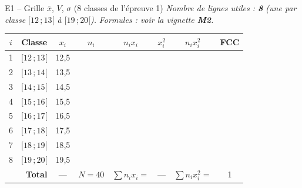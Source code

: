 \documentclass[11pt,a4paper]{article}
\begin{document}
\begin{vignetteMethode}{E1 -- Grille $\bar{x}$, $V$, $\sigma$ (8 classes de l'épreuve 1)}
\emph{Nombre de lignes utiles : \textbf{8} (une par classe $[12\,;13[$ à $[19\,;20[$).}
\emph{Formules : voir la vignette \textbf{M2}.}

\vspace{0.2cm}
\renewcommand{\arraystretch}{1.5}
\begin{center}
\small
\begin{tabular}{|c|c|c|c|c|c|c|c|}
\hline
$i$ & Classe & $x_i$ & $n_i$ & $n_i x_i$ & $x_i^2$ & $n_i x_i^2$ & FCC \\
\hline
1 & $[12\,;13[$ & 12{,}5 & & & & & \\ \hline
2 & $[13\,;14[$ & 13{,}5 & & & & & \\ \hline
3 & $[14\,;15[$ & 14{,}5 & & & & & \\ \hline
4 & $[15\,;16[$ & 15{,}5 & & & & & \\ \hline
5 & $[16\,;17[$ & 16{,}5 & & & & & \\ \hline
6 & $[17\,;18[$ & 17{,}5 & & & & & \\ \hline
7 & $[18\,;19[$ & 18{,}5 & & & & & \\ \hline
8 & $[19\,;20[$ & 19{,}5 & & & & & \\ \hline
\multicolumn{2}{|r|}{\textbf{Total}} & --- & $N=40$ & $\sum n_i x_i =$ & --- & $\sum n_i x_i^2 =$ & 1 \\ \hline
\end{tabular}
\end{center}
\end{vignetteMethode}
\end{document}
